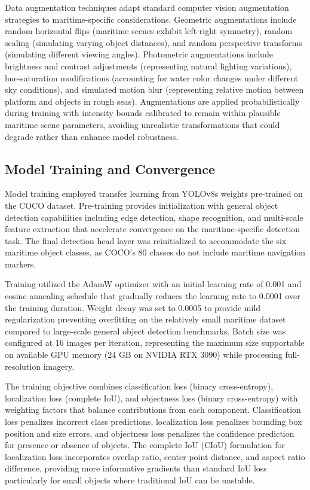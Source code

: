 Data augmentation techniques adapt standard computer vision augmentation strategies to maritime-specific considerations.
Geometric augmentations include random horizontal flips (maritime scenes exhibit left-right symmetry), random scaling (simulating varying object distances), and random perspective transforms (simulating different viewing angles).
Photometric augmentations include brightness and contrast adjustments (representing natural lighting variations), hue-saturation modifications (accounting for water color changes under different sky conditions), and simulated motion blur (representing relative motion between platform and objects in rough seas).
Augmentations are applied probabilistically during training with intensity bounds calibrated to remain within plausible maritime scene parameters, avoiding unrealistic transformations that could degrade rather than enhance model robustness.

\subsection{Model Training and Convergence} \label{sec:yolo_training convrg}

Model training employed transfer learning from YOLOv8s weights pre-trained on the COCO dataset.
Pre-training provides initialization with general object detection capabilities including edge detection, shape recognition, and multi-scale feature extraction that accelerate convergence on the maritime-specific detection task.
The final detection head layer was reinitialized to accommodate the six maritime object classes, as COCO's 80 classes do not include maritime navigation markers.

Training utilized the AdamW optimizer with an initial learning rate of 0.001 and cosine annealing schedule that gradually reduces the learning rate to 0.0001 over the training duration.
Weight decay was set to 0.0005 to provide mild regularization preventing overfitting on the relatively small maritime dataset compared to large-scale general object detection benchmarks.
Batch size was configured at 16 images per iteration, representing the maximum size supportable on available GPU memory (24 GB on NVIDIA RTX 3090) while processing full-resolution imagery.

The training objective combines classification loss (binary cross-entropy), localization loss (complete IoU), and objectness loss (binary cross-entropy) with weighting factors that balance contributions from each component.
Classification loss penalizes incorrect class predictions, localization loss penalizes bounding box position and size errors, and objectness loss penalizes the confidence prediction for presence or absence of objects.
The complete IoU (CIoU) formulation for localization loss incorporates overlap ratio, center point distance, and aspect ratio difference, providing more informative gradients than standard IoU loss particularly for small objects where traditional IoU can be unstable.


